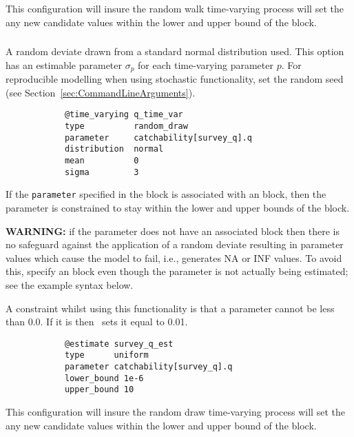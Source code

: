 This configuration will insure the random walk time-varying process will set the any new candidate values within the lower and upper bound of the  block.

\subsubsection[Random Draw]{}\label{sec:TimeVarying-RandomDraw}

A random deviate drawn from a standard normal distribution used. This option has an estimable parameter $\sigma_p$ for each time-varying parameter $p$. For reproducible modelling when using stochastic functionality, set the random seed (see Section~\ref{sec:CommandLineArguments}).

{\small{\begin{verbatim}
			@time_varying q_time_var
			type          random_draw
			parameter     catchability[survey_q].q
			distribution  normal
			mean          0
			sigma         3
\end{verbatim}}}

If the \texttt{parameter} specified in the  block is associated with an  block, then the parameter is constrained to stay within the lower and upper bounds of the  block.

\textbf{WARNING:} if the parameter does not have an associated  block then there is no safeguard against the application of a random deviate resulting in parameter values which cause the model to fail, i.e., generates NA or INF values. To avoid this, specify an  block even though the parameter is not actually being estimated; see the example syntax below.

A constraint whilst using this functionality is that a parameter cannot be less than 0.0. If it is then \CNAME\ sets it equal to 0.01.

{\small{\begin{verbatim}
			@estimate survey_q_est
			type      uniform
			parameter catchability[survey_q].q
			lower_bound 1e-6
			upper_bound 10
\end{verbatim}}}

This configuration will insure the random draw time-varying process will set the any new candidate values within the lower and upper bound of the  block.

\subsection{\label{sec:eq_parser}} 

